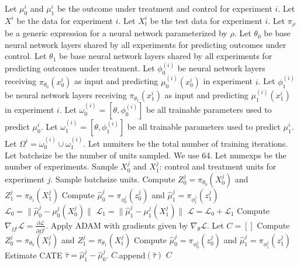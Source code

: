 \newpage 
\begin{algorithm}[H]
\caption{Multi-Head T-learner}
\label{alg:multi-t}
\begin{algorithmic}[1]
\STATE Let $\mu^{i}_0$ and $\mu^{i}_1$ be the outcome under treatment and control for experiment $i$. 
\STATE Let $X^i$ be the data for experiment $i$. Let $X^i_t$ be the test data for experiment $i$. 
\STATE Let $\pi_\rho$ be a generic expression for a neural network parameterized by $\rho$. 
\STATE Let $\theta_0$ be base neural network layers shared by all experiments for predicting outcomes under control.
\STATE Let $\theta_1$ be base neural network layers shared by all experiments for predicting outcomes under treatment.
\STATE Let $\phi_0^{(i)}$  be neural network layers receiving $\pi_{\theta_0}(x^i_0)$ as input and predicting $\mu_0^{(i)}(x^i_0)$ in experiment $i$.
\STATE Let $\phi_1^{(i)}$  be neural network layers receiving $\pi_{\theta_1}(x^i_1)$ as input and predicting $\mu_1^{(i)}(x^i_1)$ in experiment $i$.
\STATE Let $\omega_0^{(i)} = \left[\theta, \phi_0^{(i)} \right]$ be all trainable parameters used to predict $\mu_0^i$.
\STATE Let $\omega_1^{(i)} = \left[\theta, \phi_1^{(i)} \right]$ be all trainable parameters used to predict $\mu_1^i$.
\STATE Let $\Omega^i = \omega_0^{(i)} \cup \omega_1^{(i)}$. 
\STATE Let numiters be the total number of training iterations.
\STATE Let batchsize be the number of units sampled. We use 64. 
\STATE Let numexps be the number of experiments. 
\STATE Sample $X^j_0$ and $X^j_1$: control and treatment units for experiment $j$. Sample batchsize units.  
\STATE Compute $Z_0^j = \pi_{\theta_0}(X^j_0)$ and $Z_1^j = \pi_{\theta_1}(X^j_1)$
\STATE Compute $\hat{\mu}_0^j = \pi_{\phi_0^j} (z_0^j)$ and $\hat{\mu}_1^j = \pi_{\phi_1^j} (z_1^j)$
\STATE $\mathcal{L}_0= \| \hat{\mu}_0^j - \mu_0^j(X^j_0) \| $
\STATE $\mathcal{L}_1 = \| \hat{\mu}_1^j - \mu_1^j(X^j_1) \| $
\STATE $\mathcal{L} = \mathcal{L}_0 + \mathcal{L}_1$
\STATE Compute $\nabla_{\Omega^i} \mathcal{L} = \frac{\partial \mathcal{L}}{\partial \Omega^i}$.
\STATE Apply ADAM with gradients given by $\nabla_{\theta} \mathcal{L}$. 
\ENDFOR
\ENDFOR
\STATE Let $C = []$
\STATE Compute $Z_0^j = \pi_{\theta_0}(X^j_t)$ and $Z_1^j = \pi_{\theta_1}(X^j_t)$
\STATE Compute $\hat{\mu}_0^j = \pi_{\phi_0^j} (z_0^j)$ and $\hat{\mu}_1^j = \pi_{\phi_1^j} (z_1^j)$
\STATE Estimate CATE $\hat{\tau} = \hat{\mu}_1^j - \hat{\mu}_0^j$. 
\STATE $C.$append$(\hat{\tau})$
\ENDFOR
{} $C$ 
\end{algorithmic}
\end{algorithm}


